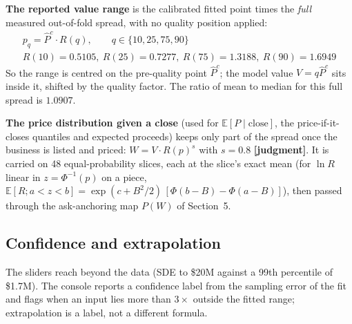 \documentclass[11pt]{article}
\newcommand{\EV}[1]{\mathbb{E}\!\left[#1\right]}
\newcommand{\jud}{\textbf{[judgment]}}
\begin{document}
\textbf{The reported value range} is the calibrated fitted point times the \emph{full} measured out-of-fold spread, with no quality position applied:
\begin{equation}
\begin{gathered}p_q=\hat P^{c}\cdot R(q),\qquad q\in\{10,25,75,90\}\\ R(10)=0.5105,\ R(25)=0.7277,\ R(75)=1.3188,\ R(90)=1.6949\end{gathered}
\end{equation}
So the range is centred on the pre-quality point $\hat P^c$; the model value $V=q\hat P^c$ sits inside it, shifted by the quality factor. The ratio of mean to median for this full spread is $1.0907$.

\textbf{The price distribution given a close} (used for $\EV{P\mid\text{close}}$, the price-if-it-closes quantiles and expected proceeds) keeps only part of the spread once the business is listed and priced: $W=V\cdot R(p)^{s}$ with $s=0.8$ \jud. It is carried on 48 equal-probability slices, each at the slice's exact mean (for $\ln R$ linear in $z=\Phi^{-1}(p)$ on a piece, $\mathbb E[R;a<z<b]=\exp(c+B^2/2)\,[\Phi(b-B)-\Phi(a-B)]$), then passed through the ask-anchoring map $P(W)$ of Section~5.

\subsection{Confidence and extrapolation}
The sliders reach beyond the data (SDE to \$20M against a 99th percentile of \$1.7M). The console reports a confidence label from the sampling error of the fit and flags when an input lies more than $3\times$ outside the fitted range; extrapolation is a label, not a different formula.
\end{document}
